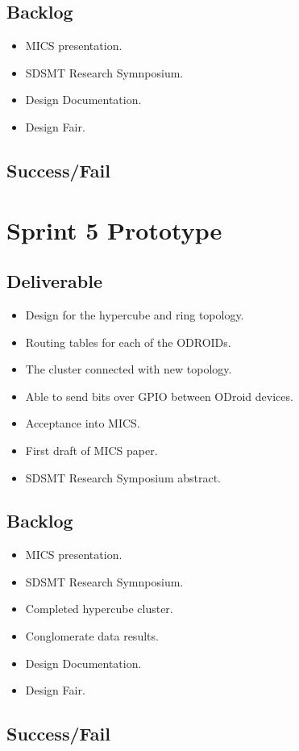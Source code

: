 \subsection{Backlog}

\begin{itemize}
\item MICS presentation.
\item SDSMT Research Symnposium.
\item Design Documentation.
\item Design Fair.
\end{itemize}

\subsection{Success/Fail}

\section{Sprint 5 Prototype}
\subsection{Deliverable}

\begin{itemize}
\item Design for the hypercube and ring topology.
\item Routing tables for each of the ODROIDs.
\item The cluster connected with new topology.
\item Able to send bits over GPIO between ODroid devices.
\item Acceptance into MICS.
\item First draft of MICS paper.
\item SDSMT Research Symposium abstract.
\end{itemize}

\subsection{Backlog}

\begin{itemize}
\item MICS presentation.
\item SDSMT Research Symnposium.
\item Completed hypercube cluster.
\item Conglomerate data results.
\item Design Documentation.
\item Design Fair.
\end{itemize}

\subsection{Success/Fail}

